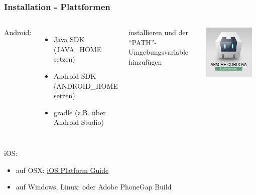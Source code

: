 \documentclass[xcolor=dvipsnames]{beamer}
\begin{document}
\begin{frame}\frametitle{Installation - Plattformen}
	\begin{columns}[t,onlytextwidth]
			Android:
			\begin{itemize}
				\item Java SDK (JAVA\_HOME setzen)
				\item Android SDK (ANDROID\_HOME setzen)
				\item gradle (z.B. über Android Studio)
			\end{itemize}
			installieren und der "`PATH"'-Umgebungsvariable hinzufügen\newline
			
		\centering
		\includegraphics[width=0.9\textwidth,valign=t]{pictures/cordova_device_is_ready}\\
	\end{columns}
	iOS:
	\begin{itemize}
		\item auf OSX: \href{https://cordova.apache.org/docs/en/latest/guide/platforms/ios/index.html}{\textcolor{cordovablue}{iOS Platform Guide}}
		\item auf Windows, Linux: {\LARGE \frownie} oder Adobe PhoneGap Build
	\end{itemize}
\end{frame}
\end{document}
